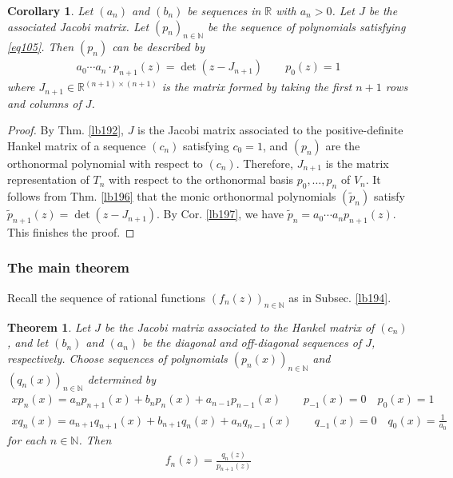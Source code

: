 \documentclass[12pt,b5paper,notitlepage]{article}
\theoremstyle{definition}
\theoremstyle{plain}
\newtheorem{thm}[df]{Theorem}
\newtheorem{co}[df]{Corollary}
\newcommand{\wtd}{\widetilde}
\newcommand{\Nbb}{\mathbb N}
\newcommand{\Rbb}{\mathbb R}
\numberwithin{equation}{section}
\begin{document}
\begin{co}\label{lb199}
Let $(a_n)$ and $(b_n)$ be sequences in $\Rbb$ with $a_n>0$. Let $J$ be the associated Jacobi matrix. Let $(p_n)_{n\in\Nbb}$ be the sequence of polynomials satisfying \eqref{eq105}. Then $(p_n)$ can be described by
\begin{align}
a_0\cdots a_n\cdot p_{n+1}(z)=\det(z-J_{n+1})\qquad p_0(z)=1
\end{align}
where $J_{n+1}\in\Rbb^{(n+1)\times(n+1)}$ is the matrix formed by taking the first $n+1$ rows and columns of $J$.
\end{co}


\begin{proof}
By Thm. \ref{lb192}, $J$ is the Jacobi matrix associated to the positive-definite Hankel matrix of a sequence $(c_n)$ satisfying $c_0=1$, and $(p_n)$ are the orthonormal polynomial with respect to $(c_n)$. Therefore, $J_{n+1}$ is the matrix representation of $T_n$ with respect to the orthonormal basis $p_0,\dots,p_n$ of $V_n$. It follows from Thm. \ref{lb196} that the monic orthonormal polynomials $(\wtd p_n)$ satisfy $\wtd p_{n+1}(z)=\det(z-J_{n+1})$. By Cor. \ref{lb197}, we have $\wtd p_n=a_0\cdots a_n p_{n+1}(z)$. This finishes the proof.
\end{proof}




\subsubsection{The main theorem}

Recall the sequence of rational functions $(f_n(z))_{n\in\Nbb}$ as in Subsec. \ref{lb194}.


\begin{thm}\label{lb200}
Let $J$ be the Jacobi matrix associated to the Hankel matrix of $(c_n)$, and let $(b_n)$ and $(a_n)$ be the diagonal and off-diagonal sequences of $J$, respectively. Choose sequences of polynomials $(p_n(x))_{n\in\Nbb}$ and $(q_n(x))_{n\in\Nbb}$ determined by
\begin{gather}
xp_n(x)=a_np_{n+1}(x)+b_np_n(x)+a_{n-1}p_{n-1}(x)\qquad p_{-1}(x)=0\quad p_0(x)=1\label{eq111}\\
xq_n(x)=a_{n+1}q_{n+1}(x)+b_{n+1}q_n(x)+a_nq_{n-1}(x)\qquad q_{-1}(x)=0\quad q_0(x)=\frac{1}{a_0}\label{eq112}
\end{gather}
for each $n\in\Nbb$. Then
\begin{align}\label{eq113}
f_n(z)=\frac{q_n(z)}{p_{n+1}(z)}
\end{align}
\end{thm}
\end{document}
